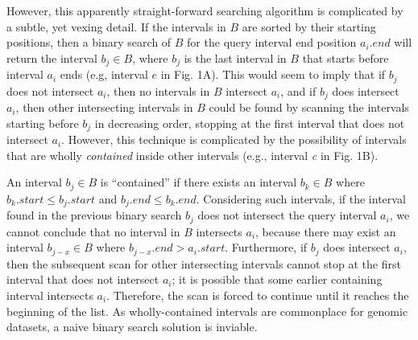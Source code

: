 \documentclass{bioinfo}
\begin{document}
        However, this apparently straight-forward searching algorithm is 
        complicated by a subtle, yet vexing detail. If the intervals in $B$ 
        are sorted by their starting positions, then a binary search of $B$ 
        for the query interval end position $a_i.end$ will return the 
        interval $b_j \in B$, where $b_j$ is the last interval in $B$ that 
        starts before interval $a_i$ ends (e.g, interval $e$ in Fig. 1A).  
        This would seem to imply that if $b_j$ does not intersect $a_i$, 
        then no intervals in $B$ intersect $a_i$, and if $b_j$ does intersect
        $a_i$, then other intersecting intervals in $B$ could be found by
        scanning the intervals starting before $b_j$ in decreasing order,
        stopping at the first interval that does not intersect $a_i$. 
        However, this technique is complicated by the possibility of 
        intervals that are wholly {\em contained} inside other intervals 
        (e.g., interval \emph{c} in Fig. 1B). 
        
        An interval $b_j\in B$ is ``contained'' if there exists an interval
        $b_k \in B$ where $b_k.start \leq b_j.start$ and $b_j.end \leq
        b_k.end$.  Considering such intervals, if the interval found in the
        previous binary search $b_j$ does not intersect the query interval
        $a_i$, we cannot conclude that no interval in $B$ intersects $a_i$,
        because there may exist an interval $b_{j-x} \in B$ where $b_{j-x}.end
        > a_i.start$.  Furthermore, if $b_j$ does intersect $a_i$, then the
        subsequent scan for other intersecting intervals cannot stop at the
        first interval that does not intersect $a_i$; it is possible that some
        earlier containing interval intersects $a_i$. Therefore, the scan is
        forced to continue until it reaches the beginning of the list. As 
        wholly-contained intervals are commonplace for genomic datasets,
        a naive binary search solution is inviable.
        
\end{document}
